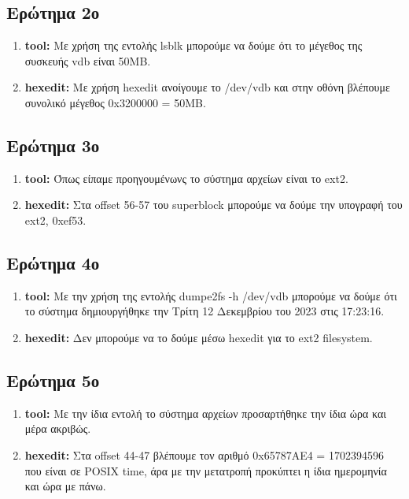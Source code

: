 \documentclass{article}
\begin{document}
\subsection{Ερώτημα 2ο}
\begin{enumerate}
    \item{\textbf{tool:} Με χρήση της εντολής lsblk μπορούμε να δούμε ότι το μέγεθος 
        της συσκευής vdb είναι 50MB.}
    \item{\textbf{hexedit:} Με χρήση hexedit ανοίγουμε το /dev/vdb και στην οθόνη βλέπουμε συνολικό μέγεθος 
        0x3200000 = 50ΜΒ.}
\end{enumerate}

\subsection{Ερώτημα 3ο}
\begin{enumerate}
\item{\textbf{tool:} Όπως είπαμε προηγουμένωνς το σύστημα αρχείων είναι το ext2. \\}
\item{\textbf{hexedit:} Στα offset 56-57 του superblock μπορούμε να δούμε την υπογραφή του ext2, 0xef53.}
\end{enumerate}

\subsection{Ερώτημα 4ο}
\begin{enumerate}
\item{\textbf{tool:} Με την χρήση της εντολής dumpe2fs -h /dev/vdb μπορούμε να δούμε ότι 
    το σύστημα δημιουργήθηκε την Τρίτη 12 Δεκεμβρίου του 2023 στις 17:23:16.}
\item{\textbf{hexedit:} Δεν μπορούμε να το δούμε μέσω hexedit για το ext2 filesystem.}
\end{enumerate}

\subsection{Ερώτημα 5ο}
\begin{enumerate}
\item{\textbf{tool:} Με την ίδια εντολή το σύστημα αρχείων προσαρτήθηκε την ίδια ώρα και μέρα 
    ακριβώς.}
\item{\textbf{hexedit:} Στα offset 44-47 βλέπουμε τον αριθμό 0x65787AE4 = 1702394596 που είναι σε
        POSIX time, άρα με την μετατροπή προκύπτει η ίδια ημερομηνία και ώρα με πάνω.}
\end{enumerate}
\end{document}

